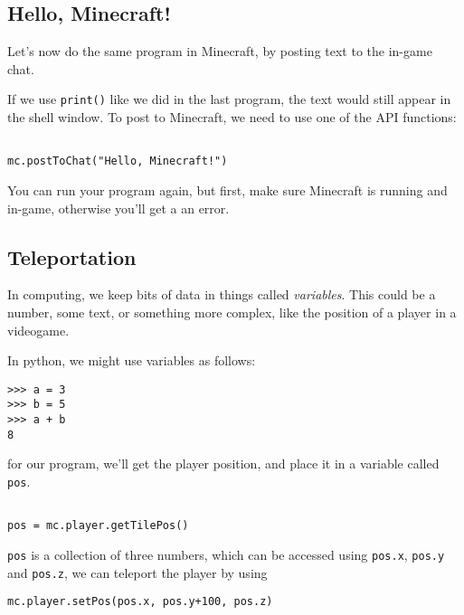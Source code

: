 	\pagebreak[1]
	\subsection*{Hello, Minecraft!}
		
		Let's now do the same program in Minecraft, by posting text to the in-game chat.

		If we use \texttt{print()} like we did in the last program, the text would still appear in the shell window. To post to Minecraft, we need to use one of the API functions:	

		\begin{lstlisting}[style=Python, firstnumber=3]

mc.postToChat("Hello, Minecraft!")
		\end{lstlisting}
		
		You can run your program again, but first, make sure Minecraft is running and in-game, otherwise you'll get a an error.
		
	\pagebreak[1]
	\subsection*{Teleportation}
	
		In computing, we keep bits of data in things called \textit{variables}. This could be a number, some text, or something more complex, like the position of a player in a videogame.
		
		In python, we might use variables as follows:
		
		\begin{lstlisting}[style=Terminal, numbers=none]
>>> a = 3
>>> b = 5
>>> a + b
8
		\end{lstlisting}
		
		for our program, we'll get the player position, and place it in a variable called \texttt{pos}.
		
		\begin{lstlisting}[style=Python, firstnumber=5]
		
pos = mc.player.getTilePos()
		\end{lstlisting}
		
		\texttt{pos} is a collection of three numbers, which can be accessed using \texttt{pos.x}, \texttt{pos.y} and \texttt{pos.z}, we can teleport the player by using

		\begin{lstlisting}[style=Python, firstnumber=7]
mc.player.setPos(pos.x, pos.y+100, pos.z)
		\end{lstlisting}
		
